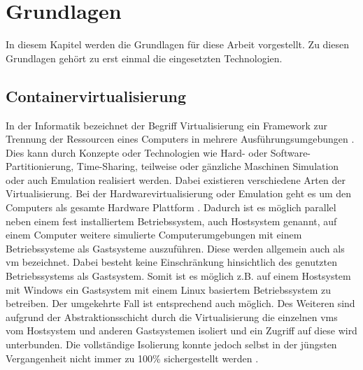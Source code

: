 \chapter{Grundlagen}
\label{sec:FUNDAMENTALS}

In diesem Kapitel werden die Grundlagen für diese Arbeit vorgestellt. Zu diesen Grundlagen gehört zu erst einmal die eingesetzten Technologien.

\section{Containervirtualisierung}
\label{sec:FUNDAMENTALS_CONTAINER}

In der Informatik bezeichnet der Begriff Virtualisierung ein Framework zur Trennung der Ressourcen eines Computers in mehrere Ausführungsumgebungen \cite{virtualization}. Dies kann durch Konzepte oder Technologien wie Hard- oder Software-Partitionierung, Time-Sharing, teilweise oder gänzliche Maschinen Simulation oder auch Emulation realisiert werden. Dabei existieren verschiedene Arten der Virtualisierung. Bei der Hardwarevirtualisierung oder Emulation geht es um den Computers als gesamte Hardware Plattform \cite{wiki:hardware_virtual}. Dadurch ist es möglich parallel neben einem fest installiertem Betriebssystem, auch Hostsystem genannt, auf einem Computer weitere simulierte Computerumgebungen mit einem Betriebssysteme als Gastsysteme auszuführen. Diese werden allgemein auch als \ac{vm} bezeichnet. Dabei besteht keine Einschränkung hinsichtlich des genutzten Betriebssystems als Gastsystem. Somit ist es möglich z.B. auf einem Hostsystem mit Windows ein Gastsystem mit einem Linux basiertem Betriebssystem zu betreiben. Der umgekehrte Fall ist entsprechend auch möglich. Des Weiteren sind aufgrund der Abstraktionsschicht durch die Virtualisierung die einzelnen \acp{vm} vom Hostsystem und anderen Gastsystemen isoliert und ein Zugriff auf diese wird unterbunden. Die vollständige Isolierung konnte jedoch selbst in der jüngsten Vergangenheit nicht immer zu 100\% sichergestellt werden \cite{CVE-2017-4934}.

